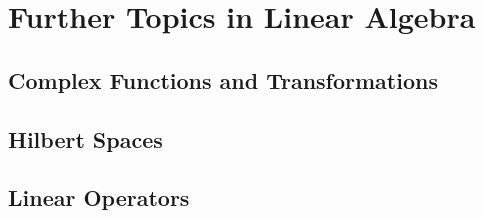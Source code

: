 \documentclass[12pt,letterpaper, openany]{book} %
\begin{document}
 
\frontmatter



%
 
\clearpage
\thispagestyle{empty}
 
\tableofcontents
 
\mainmatter

\setcounter{part}{4}
\part{Further Topics in Linear Algebra}

\chapter{Complex Functions and Transformations}
 

\chapter{Hilbert Spaces}


\chapter{Linear Operators}


%
\end{document}
